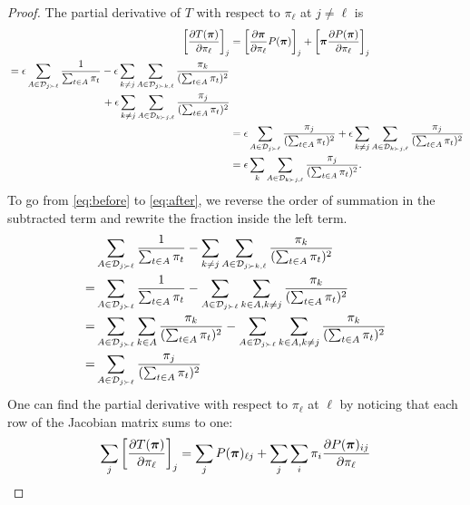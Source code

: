 \begin{proof}
The partial derivative of $T$ with respect to $\pi_\ell$ at $j \ne \ell$ is
\begin{align}
\left[ \frac{\partial T(\bm{\pi})}{\partial \pi_\ell} \right]_j
&= \left[ \frac{\partial \bm{\pi}}{\partial \pi_\ell} P(\bm{\pi}) \right]_j + \left[ \bm{\pi} \frac{\partial P(\bm{\pi})}{\partial \pi_\ell} \right]_j \\
\begin{split}
&= \epsilon \sum_{A \in \mathcal{D}_{j \succ \ell}} \frac{1}{\sum_{t \in A} \pi_t}
    - \epsilon \sum_{k \ne j} \sum_{A \in \mathcal{D}_{j \succ k,\ell}} \frac{\pi_k}{(\sum_{t \in A} \pi_t)^2} \\
    & \qquad\qquad\qquad\qquad\quad + \epsilon \sum_{k \ne j} \sum_{A \in \mathcal{D}_{k \succ j,\ell}} \frac{\pi_j}{(\sum_{t \in A} \pi_t)^2}
\end{split} \label{eq:before}\\
&= \epsilon \sum_{A \in \mathcal{D}_{j \succ \ell}} \frac{\pi_j}{(\sum_{t \in A} \pi_t)^2}
    + \epsilon \sum_{k \ne j} \sum_{A \in \mathcal{D}_{k \succ j,\ell}} \frac{\pi_j}{(\sum_{t \in A} \pi_t)^2} \label{eq:after}\\
&= \epsilon \sum_{k} \sum_{A \in \mathcal{D}_{k \succ j,\ell}} \frac{\pi_j}{(\sum_{t \in A} \pi_t)^2}.
\end{align} 
To go from \eqref{eq:before} to \eqref{eq:after}, we reverse the order of summation in the subtracted term and rewrite the fraction inside the left term.
\begin{align}
 & \sum_{A \in \mathcal{D}_{j \succ \ell}} \frac{1}{\sum_{t \in A} \pi_t}
    - \sum_{k \ne j} \sum_{A \in \mathcal{D}_{j \succ k,\ell}} \frac{\pi_k}{(\sum_{t \in A} \pi_t)^2} \\
=& \sum_{A \in \mathcal{D}_{j \succ \ell}} \frac{1}{\sum_{t \in A} \pi_t}
    - \sum_{A \in \mathcal{D}_{j \succ \ell}} \sum_{k \in A, k \ne j} \frac{\pi_k}{(\sum_{t \in A} \pi_t)^2} \\
=& \sum_{A \in \mathcal{D}_{j \succ \ell}} \sum_{k \in A} \frac{\pi_k}{(\sum_{t \in A} \pi_t)^2}
    - \sum_{A \in \mathcal{D}_{j \succ \ell}} \sum_{k \in A, k \ne j} \frac{\pi_k}{(\sum_{t \in A} \pi_t)^2} \\
=& \sum_{A \in \mathcal{D}_{j \succ \ell}} \frac{\pi_j}{(\sum_{t \in A} \pi_t)^2}
\end{align}
One can find the partial derivative with respect to $\pi_\ell$ at $\ell$ by noticing that each row of the Jacobian matrix sums to one:
\begin{align}
\sum_j \left[ \frac{\partial T(\vpi)}{\partial \pi_\ell} \right]_j
&=\sum_j P(\vpi)_{\ell j} + \sum_j \sum_i \pi_i \frac{\partial P(\vpi)_{ij}}{\partial \pi_\ell} \\

\end{align}
\end{proof}

